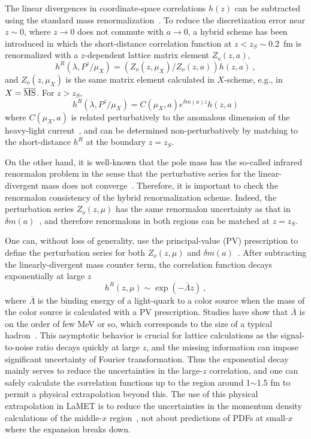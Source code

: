 \documentclass[prd,aps,twocolumn,preprintnumbers,showpacs,nofootinbib,superscriptaddress,notitlepage]{revtex4-2}
\begin{document}
The linear divergences in coordinate-space correlations $h(z)$ can be subtracted using the standard mass renormalization~\cite{Ishikawa:2016znu,Chen:2016fxx,LatticePartonCollaborationLPC:2021xdx}. 
To reduce the discretization error near $z\sim 0$, where $z\to 0$ does not commute with $a\to 0$, 
a hybrid scheme has been introduced in which the short-distance correlation function at $z<z_S\sim 0.2$~fm is renormalized with a $z$-dependent lattice matrix element $Z_o(z,a)$, 
\begin{equation}
    h^R(\lambda,P^z/\mu_X) = \left(Z_o(z,\mu_X)/Z_o(z,a)\right) h(z,a)  \ , 
\end{equation}
and $Z_o(z,\mu_X)$ is the same matrix element calculated in $X$-scheme, e.g., in $X=\overline{\rm MS}$. 
For $z>z_S$, 
\begin{equation}
    h^R(\lambda,P^z/\mu_X) = C(\mu_X,a)e^{\delta m(a)z} h(z,a)
\end{equation}
where $C(\mu_X,a)$ is related perturbatively to the anomalous dimension of the heavy-light current~\cite{Ji:1991pr}, and can be determined non-perturbatively by matching to the short-distance $h^R$ at the boundary $z=z_S$. 

On the other hand, it is well-known that the pole mass has the so-called infrared renormalon problem in the sense that the perturbative series for the linear-divergent mass does not converge~\cite{tHooft:1977xjm}. Therefore, it is important to check the renormalon consistency of the hybrid renormalization scheme. Indeed, the perturbation series $Z_o(z,\mu)$ has the same renormalon uncertainty as that in $\delta m(a)$~\cite{Braun:2018brg}, and therefore
renormalons in both regions can be matched at $z=z_S$. 

One can, without loss of generality, use the principal-value (PV) prescription
to define the perturbation series for both $Z_o(z,\mu)$ and $\delta m(a)$~\cite{Ayala:2019uaw}. After subtracting the linearly-divergent mass counter term, the correlation function decays exponentially 
at large $z$~\cite{Burkardt:1994pw}
\begin{equation}
    h^R(z,\mu) \sim \exp(-\bar \Lambda z) \ , 
\end{equation}
where $\bar \Lambda $ is the binding energy of a light-quark to a color source when the mass of the color source is calculated with a PV prescription. Studies have show that $\bar \Lambda $ is on the order of few MeV or so, which corresponds to the size of a typical hadron~\cite{Ayala:2019hkn}. This asymptotic behavior is crucial for lattice calculations as the signal-to-noise ratio decays quickly at large $z$, and the missing information can impose significant uncertainty of Fourier transformation. Thus the exponential decay mainly serves to reduce the uncertainties in the large-$z$ correlation, and one can safely calculate the correlation functions up to the region around 1$\sim $1.5 fm to permit a physical extrapolation beyond this. The use of this physical extrapolation in LaMET is to reduce the uncertainties in the momentum density calculations of the middle-$x$ region~\cite{Gao:2021dbh}, not about predictions of PDFs at small-$x$ where the expansion breaks down.
\end{document}
